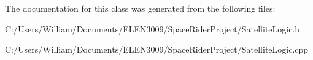 The documentation for this class was generated from the following files\+:\begin{DoxyCompactItemize}
\item 
C\+:/\+Users/\+William/\+Documents/\+E\+L\+E\+N3009/\+Space\+Rider\+Project/Satellite\+Logic.\+h\item 
C\+:/\+Users/\+William/\+Documents/\+E\+L\+E\+N3009/\+Space\+Rider\+Project/Satellite\+Logic.\+cpp\end{DoxyCompactItemize}
